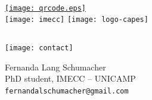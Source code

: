\section{}
\begin{frame}
\begin{columns}
 \\
\href{https://arxiv.org/abs/2002.01040}{\texttt{[image: qrcode.eps]}}
\vspace{-.4cm} 
\\\texttt{[image: imecc]} \hspace{.5cm}
\texttt{[image: logo-capes]}
\end{columns}

\vfill

\fboxsep=0pt
\noindent%
\begin{minipage}[t]{0.38\linewidth}
\begin{flushright} 
\vspace{.01cm}
\texttt{[image: contact]}
\end{flushright}
\end{minipage}%
\hfill%
\begin{minipage}[t]{0.6\linewidth}
\begin{flushright} 
\color{paynesgrey}
Fernanda Lang Schumacher\\
PhD student, IMECC -- UNICAMP\\
\color{black}
\nolinkurl{fernandalschumacher@gmail.com}
\end{flushright}
\end{minipage}
\end{frame}
